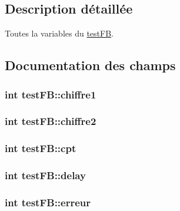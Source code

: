 \subsection{Description détaillée}
Toutes la variables du \hyperlink{structtest_f_b}{test\+FB}. 

\subsection{Documentation des champs}
\subsubsection[{\texorpdfstring{chiffre1}{chiffre1}}]{\setlength{\rightskip}{0pt plus 5cm}int test\+F\+B\+::chiffre1}\hypertarget{structtest_f_b_a356f4fce8c2f522fd08f4c45a5f59570}{}\label{structtest_f_b_a356f4fce8c2f522fd08f4c45a5f59570}
\subsubsection[{\texorpdfstring{chiffre2}{chiffre2}}]{\setlength{\rightskip}{0pt plus 5cm}int test\+F\+B\+::chiffre2}\hypertarget{structtest_f_b_a993aa24e718fb4568cd55d88feecb851}{}\label{structtest_f_b_a993aa24e718fb4568cd55d88feecb851}
\subsubsection[{\texorpdfstring{cpt}{cpt}}]{\setlength{\rightskip}{0pt plus 5cm}int test\+F\+B\+::cpt}\hypertarget{structtest_f_b_aa9a520b6a87fe214467f1ab30e4cab53}{}\label{structtest_f_b_aa9a520b6a87fe214467f1ab30e4cab53}
\subsubsection[{\texorpdfstring{delay}{delay}}]{\setlength{\rightskip}{0pt plus 5cm}int test\+F\+B\+::delay}\hypertarget{structtest_f_b_afce45aec2fc30e60d9261d5f5a3975d5}{}\label{structtest_f_b_afce45aec2fc30e60d9261d5f5a3975d5}
\subsubsection[{\texorpdfstring{erreur}{erreur}}]{\setlength{\rightskip}{0pt plus 5cm}int test\+F\+B\+::erreur}\hypertarget{structtest_f_b_ae27714bfada1c6176b1af512491dbd00}{}\label{structtest_f_b_ae27714bfada1c6176b1af512491dbd00}
